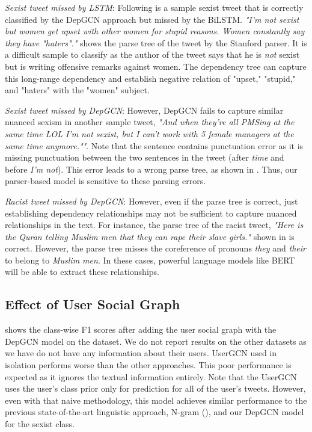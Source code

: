 \emph{Sexist tweet missed by LSTM}: Following is a sample sexist tweet that is correctly classified by the DepGCN approach but missed by the BiLSTM.
\textit{"I'm not sexist but women get upset with other women for stupid reasons. Women constantly say they have "haters"."}
 shows the parse tree of the tweet by the Stanford parser. It is a difficult sample to classify as the author of the tweet says that he is \textit{not} sexist but is writing offensive remarks against women. The dependency tree can capture this long-range dependency and establish negative relation of "upset," "stupid," and "haters" with the "women" subject.


\emph{Sexist tweet missed by DepGCN}: However, DepGCN fails to capture similar nuanced sexism in another sample tweet, \textit{"And when they're all PMSing at the same time LOL I'm not sexist, but I can't work with 5 female managers at the same time anymore.""}. Note that the sentence contains punctuation error as it is missing punctuation between the two sentences in the tweet (after \textit{time} and before \textit{I'm not}). This error leads to a wrong parse tree, as shown in . Thus, our parser-based model is sensitive to these parsing errors.

\emph{Racist tweet missed by DepGCN}: However, even if the parse tree is correct, just establishing dependency relationships may not be sufficient to capture nuanced relationships in the text. For instance, the parse tree of the racist tweet,
\textit{"Here is the Quran telling Muslim men that they can rape their slave girls."} shown in  is correct. However, the parse tree misses the coreference of pronouns \textit{they} and \textit{their} to belong to \textit{Muslim men}. In these cases, powerful language models like BERT will be able to extract these relationships.

\subsection{Effect of User Social Graph}
 shows the class-wise F1 scores after adding the user social graph with the DepGCN model on the \citet{waseem-hovy-2016} dataset. We do not report results on the other datasets as we have do not have any information about their users. UserGCN used in isolation performs worse than the other approaches.
This poor performance is expected as it ignores the textual information entirely. Note that the UserGCN uses the user's class prior only for prediction for all of the user's tweets. However, even with that naive methodology, this model achieves similar performance to the previous state-of-the-art linguistic approach, N-gram (), and our DepGCN model for the sexist class.


